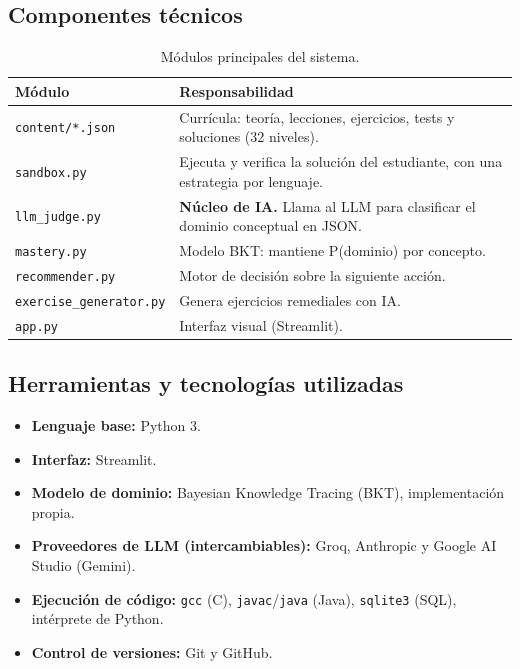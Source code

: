 \documentclass[11pt,letterpaper]{article}
\begin{document}
\subsection{Componentes técnicos}
\begin{table}[H]
\centering
\small
\begin{tabular}{@{}p{4cm}p{9cm}@{}}
\toprule
\textbf{Módulo} & \textbf{Responsabilidad} \\
\midrule
\texttt{content/*.json} & Currícula: teoría, lecciones, ejercicios,
tests y soluciones (32 niveles). \\
\texttt{sandbox.py} & Ejecuta y verifica la solución del estudiante,
con una estrategia por lenguaje. \\
\texttt{llm\_judge.py} & \textbf{Núcleo de IA.} Llama al LLM para
clasificar el dominio conceptual en JSON. \\
\texttt{mastery.py} & Modelo BKT: mantiene P(dominio) por concepto. \\
\texttt{recommender.py} & Motor de decisión sobre la siguiente
acción. \\
\texttt{exercise\_generator.py} & Genera ejercicios remediales con IA. \\
\texttt{app.py} & Interfaz visual (Streamlit). \\
\bottomrule
\end{tabular}
\caption{Módulos principales del sistema.}
\end{table}

\subsection{Herramientas y tecnologías utilizadas}
\begin{itemize}[leftmargin=*]
  \item \textbf{Lenguaje base:} Python 3.
  \item \textbf{Interfaz:} Streamlit.
  \item \textbf{Modelo de dominio:} Bayesian Knowledge Tracing (BKT),
  implementación propia.
  \item \textbf{Proveedores de LLM (intercambiables):} Groq, Anthropic
  y Google AI Studio (Gemini).
  \item \textbf{Ejecución de código:} \texttt{gcc} (C),
  \texttt{javac}/\texttt{java} (Java), \texttt{sqlite3} (SQL),
  intérprete de Python.
  \item \textbf{Control de versiones:} Git y GitHub.
\end{itemize}
\end{document}
